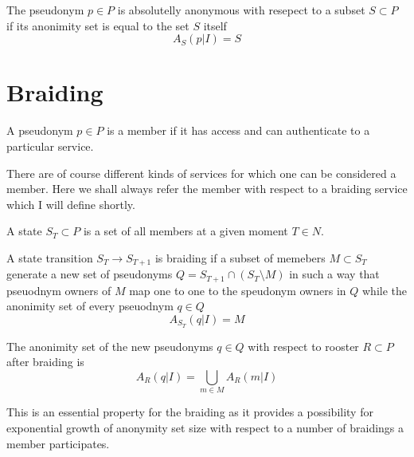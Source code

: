 \documentclass[12pt]{article}
\newenvironment{corollary}[2][Corollary]{\begin{trivlist}
\item[\hskip \labelsep {\bfseries #1}\hskip \labelsep {\bfseries #2.}]}{\end{trivlist}}
\newenvironment{definition}[2][Definition]{\begin{trivlist}
\item[\hskip \labelsep {\bfseries #1}\hskip \labelsep {\bfseries #2.}]}{\end{trivlist}}
\begin{document}
\begin{definition}{(absolute anonimity)}
  The pseudonym $p \in P$ is absolutelly anonymous with resepect to a subset $S \subset P$ if its anonimity set is equal to the set $S$ itself
  \begin{equation}
    A_S(p|I) = S
  \end{equation}
\end{definition}

\section*{Braiding}

\begin{definition}{(member)}
  A pseudonym $p \in P$ is a member if it has access and can authenticate to a particular service.
\end{definition}

There are of course different kinds of services for which one can be considered a member. Here we shall always refer the member with respect to a braiding service which I will define shortly.

\begin{definition}{(state)}
  A state $S_T \subset P$ is a set of all members at a given moment $T \in N$.
\end{definition}


\begin{definition}{(braiding)}
  A state transition $S_T \to S_{T+1}$ is braiding if a subset of memebers $M \subset S_T$ generate a new set of pseudonyms $Q = S_{T+1} \cap (S_T \setminus M) $ in such a way that pseuodnym owners of $M$ map one to one to the speudonym owners in $Q$ while the anonimity set of every pseuodnym $q \in Q$
  \begin{equation}
    A_{S_T}(q|I) = M
  \end{equation}
\end{definition}

\begin{corollary}{II}
  The anonimity set of the new pseudonyms $q \in Q$ with respect to rooster $R \subset P$ after braiding is
  \begin{equation}
    A_R(q | I) = \bigcup_{m \in M} A_R(m|I) \label{eq:1}
  \end{equation}
\end{corollary}
This is an essential property for the braiding as it provides a possibility for exponential growth of anonymity set size with respect to a number of braidings a member participates.
\end{document}
